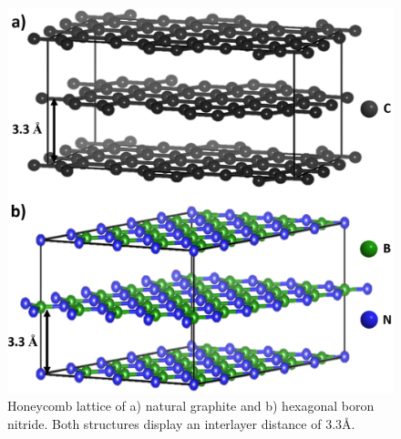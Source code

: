 \begin{figure}[tbh!]
\centering
\includegraphics[width=\textwidth]{Figures/BOhBN/grpBNcomp}
\caption{Honeycomb lattice of a) natural graphite and b) hexagonal boron nitride. Both structures display an interlayer distance of 3.3\AA.}
\label{Figures/BOhBN:grpBNcomp}
\end{figure}


